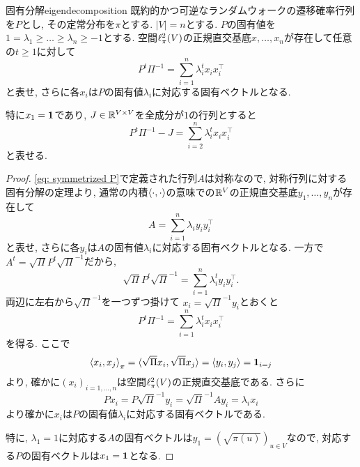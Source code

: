%
\begin{theorem}{固有分解}{eigendecomposition}
    既約的かつ可逆なランダムウォークの遷移確率行列を$P$とし, その定常分布を$\pi$とする.
    $|V|=n$とする.
    $P$の固有値を$1=\lambda_1\ge \dots \ge \lambda_n \ge -1$とする.
    空間$\ell^2_\pi(V)$の正規直交基底$x,\dots,x_n$が存在して任意の$t\ge 1$に対して
    \[ P^t\Pi^{-1} = \sum_{i=1}^n \lambda_i^t x_i x_i^{\top}  \]
    と表せ, さらに各$x_i$は$P$の固有値$\lambda_i$に対応する固有ベクトルとなる.

    特に$x_1 = \mathbf{1}$であり,
    $J \in \mathbb{R}^{V \times V}$を全成分が$1$の行列とすると
    \[ P^t \Pi^{-1} - J =  \sum_{i=2}^n \lambda_i^t x_i x_i^\top \]
    と表せる.
\end{theorem}
\begin{proof}
    \cref{eq: symmetrized P}で定義された行列$A$は対称なので,
    対称行列に対する固有分解の定理より,
    通常の内積$\langle\cdot, \cdot\rangle$の意味での$\mathbb{R}^V$の正規直交基底$y_1,\dots,y_n$が存在して
    \[
        A = \sum_{i=1}^n \lambda_i y_i y_i^\top
    \]
    と表せ, さらに各$y_i$は$A$の固有値$\lambda_i$に対応する固有ベクトルとなる.
    一方で$A^t = \sqrt{\Pi} P^t \sqrt{\Pi}^{-1}$だから,
    \[
        \sqrt{\Pi} P^t \sqrt{\Pi}^{-1} = \sum_{i=1}^n \lambda_i^t y_i y_i^\top.
    \]
    両辺に左右から$\sqrt{\Pi}^{-1}$を一つずつ掛けて
    $x_i = \sqrt{\Pi}^{-1}y_i$とおくと
    \[
        P^t \Pi^{-1} = \sum_{i=1}^n \lambda_i^t x_i x_i^\top
    \]
    を得る.
    ここで
    \[
        \left\langle x_i,x_j\right\rangle_{\pi} = \langle\sqrt{\Pi}x_i,\sqrt{\Pi}x_j\rangle = \langle y_i,y_j\rangle = \mathbf{1}_{i=j}
    \]
    より, 確かに$(x_i)_{i=1,\dots,n}$は空間$\ell^2_\pi(V)$の正規直交基底である.
    さらに
    \[
        Px_i = P\sqrt{\Pi}^{-1}y_i = \sqrt{\Pi}^{-1}Ay_i = \lambda_i x_i
    \]
    より確かに$x_i$は$P$の固有値$\lambda_i$に対応する固有ベクトルである.

    特に, $\lambda_1=1$に対応する$A$の固有ベクトルは$y_1 = (\sqrt{\pi(u)})_{u \in V}$なので,
    対応する$P$の固有ベクトルは$x_1 = \mathbf{1}$となる.
\end{proof}

